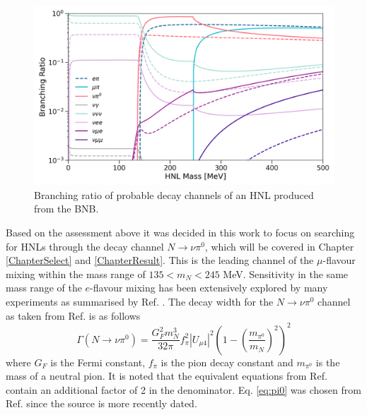 \begin{figure}[ht!] 
\centering    
\includegraphics[width=1.0\textwidth]{branching_ratio}
\caption[Branching Ratio of Heavy Neutral Leptons]
{
Branching ratio of probable decay channels of an HNL produced from the BNB.
}
\label{fig:branchingRatio}
\end{figure}


Based on the assessment above it was decided in this work to focus on searching for HNLs through the decay channel $N\rightarrow\nu \pi^{0}$, which will be covered in Chapter \ref{ChapterSelect} and \ref{ChapterResult}.  
This is the leading channel of the $\mu$-flavour mixing within the mass range of $ 135 < m_{N} < 245 $ MeV.
Sensitivity in the same mass range of the $e$-flavour mixing has been extensively explored by many experiments as summarised by Ref. \cite{HNLWhitePaper}.
The decay width for the $N\rightarrow\nu \pi^{0}$ channel as taken from Ref. \cite{HNLZarko} is as follows
\begin{equation}
	\Gamma(N\rightarrow \nu \pi^{0}) = \frac{G_{F}^{2}m_{N}^{3}}{32\pi}f^{2}_{\pi}|U_{\mu4}|^{2}\left(1-\left(\frac{m_{\pi^{0}}}{m_{N}}\right)^{2}\right)^{2}
\label{eq:pi0}
\end{equation}
where $G_{F}$ is the Fermi constant, $f_{\pi}$ is the pion decay constant and $m_{\pi^{0}}$ is the mass of a neutral pion.
It is noted that the equivalent equations from Ref. \cite{SBNHNL, HNLBin} contain an additional factor of 2 in the denominator.
Eq. \ref{eq:pi0} was chosen from Ref. \cite{HNLZarko} since the source is more recently dated. 

